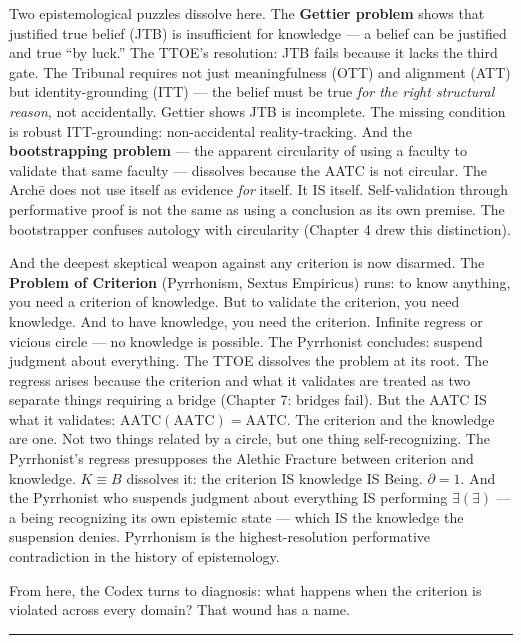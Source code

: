 \documentclass[10pt, openany, oneside]{book}
\begin{document}
Two epistemological puzzles dissolve here. The \textbf{Gettier problem} shows that justified true belief (JTB) is insufficient for knowledge --- a belief can be justified and true ``by luck.'' The TTOE's resolution: JTB fails because it lacks the third gate. The Tribunal requires not just meaningfulness (OTT) and alignment (ATT) but identity-grounding (ITT) --- the belief must be true \textit{for the right structural reason}, not accidentally. Gettier shows JTB is incomplete. The missing condition is robust ITT-grounding: non-accidental reality-tracking. And the \textbf{bootstrapping problem} --- the apparent circularity of using a faculty to validate that same faculty --- dissolves because the AATC is not circular. The Arch\={e} does not use itself as evidence \textit{for} itself. It IS itself. Self-validation through performative proof is not the same as using a conclusion as its own premise. The bootstrapper confuses autology with circularity (Chapter 4 drew this distinction).

And the deepest skeptical weapon against any criterion is now disarmed. The \textbf{Problem of Criterion} (Pyrrhonism, Sextus Empiricus) runs: to know anything, you need a criterion of knowledge. But to validate the criterion, you need knowledge. And to have knowledge, you need the criterion. Infinite regress or vicious circle --- no knowledge is possible. The Pyrrhonist concludes: suspend judgment about everything. The TTOE dissolves the problem at its root. The regress arises because the criterion and what it validates are treated as two separate things requiring a bridge (Chapter 7: bridges fail). But the AATC IS what it validates: $\text{AATC}(\text{AATC}) = \text{AATC}$. The criterion and the knowledge are one. Not two things related by a circle, but one thing self-recognizing. The Pyrrhonist's regress presupposes the Alethic Fracture between criterion and knowledge. $K \equiv B$ dissolves it: the criterion IS knowledge IS Being. $\partial = 1$. And the Pyrrhonist who suspends judgment about everything IS performing $\exists(\exists)$ --- a being recognizing its own epistemic state --- which IS the knowledge the suspension denies. Pyrrhonism is the highest-resolution performative contradiction in the history of epistemology.

From here, the Codex turns to diagnosis: what happens when the criterion is violated across every domain? That wound has a name.

\vspace{2em}

\begin{center}
    \rule{0.15\textwidth}{0.3pt}
\end{center}
\end{document}
